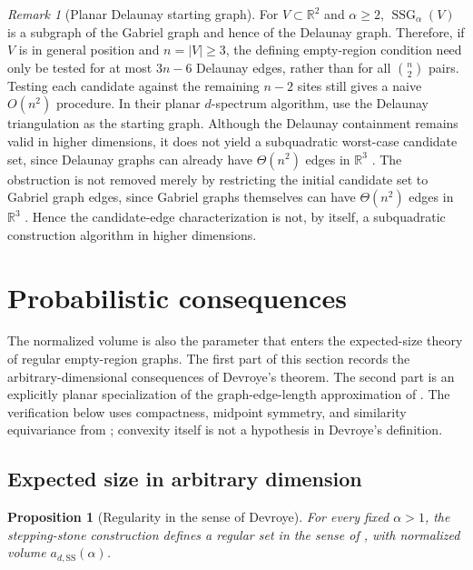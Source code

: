 \documentclass[a4paper,fleqn]{cas-dc}
\newtheorem{proposition}{Proposition}
\theoremstyle{definition}
\theoremstyle{remark}
\newtheorem{remark}{Remark}
\newcommand{\R}{\mathds{R}}
\newcommand{\0}{\mathbf{0}}
\DeclareMathOperator{\SSG}{SSG}
\begin{document}
\begin{remark}[Planar Delaunay starting graph]
For \(V\subset\R^2\) and \(\alpha\geq2\),
\(\SSG_\alpha(V)\) is a subgraph of the Gabriel graph and hence of the
Delaunay graph. Therefore, if \(V\) is in general position and
\(n=|V|\geq3\), the defining empty-region condition need only be tested for
at most \(3n-6\) Delaunay edges, rather than for all \(\binom{n}{2}\)
pairs. Testing each candidate against the remaining \(n-2\) sites still gives
a naive \(O(n^2)\) procedure.
In their planar \(d\)-spectrum algorithm,
\citet{kannangara2018stepping,kannangara2019stepping} use the Delaunay
triangulation as the starting graph.
Although the Delaunay containment remains valid in higher dimensions,
it does not yield a subquadratic worst-case candidate set, since Delaunay
graphs can already have \(\Theta(n^2)\) edges in \(\R^3\)
\citep{agarwal1992relative}. The obstruction is not removed merely by 
restricting the initial candidate
set to Gabriel graph edges, since Gabriel graphs themselves can have
$\Theta(n^2)$ edges in $\R^3$
\citep[Lemma~5.1]{chazelle1994selecting}. Hence the candidate-edge
characterization is not, by itself, a subquadratic construction
algorithm in higher dimensions.
\end{remark}

\section{Probabilistic consequences}
\label{sec:probabilistic-consequences}

The normalized volume is also the parameter that enters the expected-size
theory of regular empty-region graphs. The first part of this section records
the arbitrary-dimensional consequences of Devroye's theorem. The second part
is an explicitly planar specialization of the graph-edge-length approximation
of \citet{watanabe2008evaluating}.
The verification below uses compactness, midpoint symmetry, and similarity
equivariance from ; convexity itself is not a hypothesis in
Devroye's definition.

\subsection{Expected size in arbitrary dimension}

\begin{proposition}[Regularity in the sense of Devroye]
\label{prop:devroye-regularity}
For every fixed $\alpha>1$, the stepping-stone construction defines a regular
set in the sense of \citet{devroye1988expected}, with normalized volume
$a_{d,\mathrm{SS}}(\alpha)$.
\end{proposition}
\end{document}

